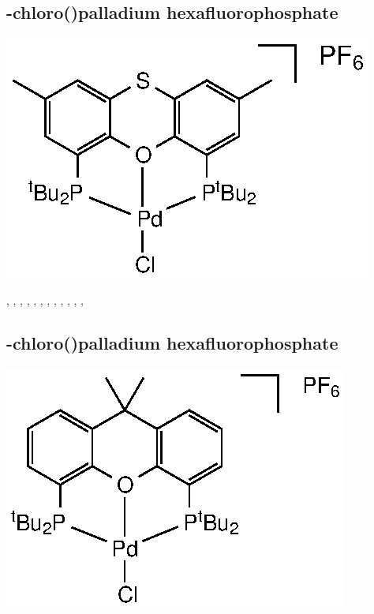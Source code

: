 \subsection*{\trans-chloro(\tBuThixantphos)palladium hexafluorophosphate}
\begin{structure}[h]
\begin{center}
\includegraphics{../Structures/StBuPdClPF6.eps}
\end{center}
\end{structure}


,
,
,
,
,
,
,
,
,
,
,
,

\subsection*{\trans-chloro(\tBuXantphos)palladium hexafluorophosphate}
\begin{structure}[h]
\begin{center}
\includegraphics{../Structures/CtBuPdClPF6.eps}
\end{center}
\end{structure}

